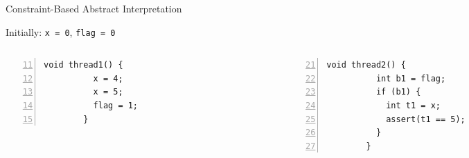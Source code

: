 \documentclass[t]{beamer}
\begin{document}
\begin{frame}[fragile]{Constraint-Based Abstract Interpretation}
  \begin{center}
    Initially: \texttt{x = 0}, \texttt{flag = 0}
  \end{center}
  \begin{columns}
    \begin{column}{0.5\linewidth}
      \begin{lstlisting}[name=th201
                        , numbers=left
                        , firstnumber=11
                        , gobble=8]
        void thread1() {
          x = 4;
          x = 5;
          flag = 1;
        }
      \end{lstlisting}
    \end{column}
    \begin{column}{0.5\linewidth}
      \begin{lstlisting}[name=th202
                        , numbers=left
                        , firstnumber=21
                        , gobble=8]
        void thread2() {
          int b1 = flag;
          if (b1) {
            int t1 = x;
            assert(t1 == 5);
          }
        }
      \end{lstlisting}
    \end{column}
  \end{columns}
\end{frame}
\end{document}
